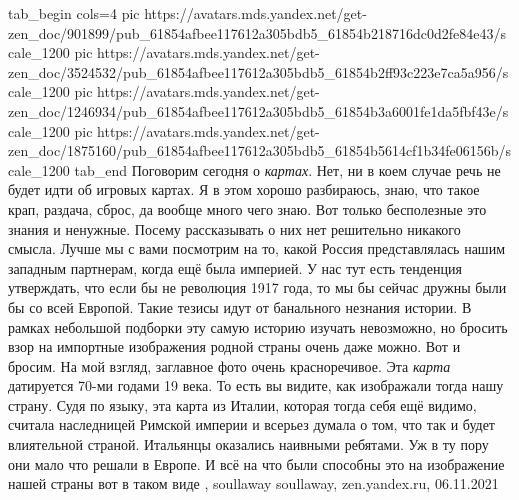 
\ifcmt
  tab_begin cols=4
     pic https://avatars.mds.yandex.net/get-zen_doc/901899/pub_61854afbee117612a305bdb5_61854b218716dc0d2fe84e43/scale_1200
     pic https://avatars.mds.yandex.net/get-zen_doc/3524532/pub_61854afbee117612a305bdb5_61854b2ff93c223e7ca5a956/scale_1200
		 pic https://avatars.mds.yandex.net/get-zen_doc/1246934/pub_61854afbee117612a305bdb5_61854b3a6001fe1da5fbf43e/scale_1200
		 pic https://avatars.mds.yandex.net/get-zen_doc/1875160/pub_61854afbee117612a305bdb5_61854b5614cf1b34fe06156b/scale_1200
  tab_end
\fi
Поговорим сегодня о \emph{картах}. Нет, ни в коем случае речь не будет идти об
игровых картах. Я в этом хорошо разбираюсь, знаю, что такое крап, раздача,
сброс, да вообще много чего знаю. Вот только бесполезные это знания и ненужные.
Посему рассказывать о них нет решительно никакого смысла. Лучше мы с вами
посмотрим на то, какой Россия представлялась нашим западным партнерам, когда
ещё была империей. У нас тут есть тенденция утверждать, что если бы не
революция 1917 года, то мы бы сейчас дружны были бы со всей Европой. Такие
тезисы идут от банального незнания истории. В рамках небольшой подборки эту
самую историю изучать невозможно, но бросить взор на импортные изображения
родной страны очень даже можно. Вот и бросим.  На мой взгляд, заглавное фото
очень красноречивое. Эта \emph{карта} датируется 70-ми годами 19 века. То есть
вы видите, как изображали тогда нашу страну. Судя по языку, эта карта из
Италии, которая тогда себя ещё видимо, считала наследницей Римской империи и
всерьез думала о том, что так и будет влиятельной страной.  Итальянцы оказались
наивными ребятами. Уж в ту пору они мало что решали в Европе. И всё на что были
способны это на изображение нашей страны вот в таком виде
, 
soullaway soullaway, zen.yandex.ru, 06.11.2021
